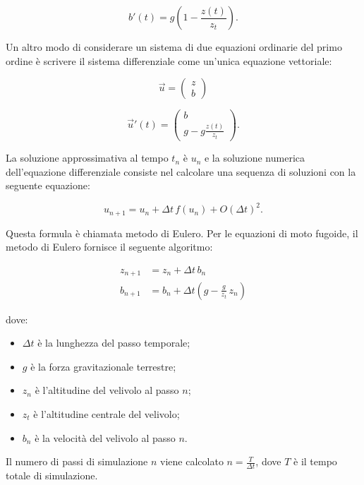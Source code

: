 \begin{equation}
b'(t) = g\left(1-\frac{z(t)}{z_t}\right).
\end{equation}

\noindent
Un altro modo di considerare un sistema di due equazioni ordinarie del primo ordine è scrivere il sistema differenziale come un’unica equazione vettoriale:

\begin{equation}
\vec{u}  = \begin{pmatrix} z \\ b \end{pmatrix}
\end{equation}

\begin{equation}
\vec{u}'(t)  = \begin{pmatrix} b\\ g-g\frac{z(t)}{z_t} \end{pmatrix}.
\end{equation}

\noindent
La soluzione approssimativa al tempo $t_n$ è $u_n$ e la soluzione numerica dell’equazione differenziale consiste nel calcolare una sequenza di soluzioni con la seguente equazione:

\begin{equation}
u_{n+1} = u_n + \Delta t \,f(u_n) + O(\Delta t)^2.
\end{equation}

\noindent
Questa formula è chiamata metodo di Eulero. Per le equazioni di moto fugoide, il metodo di Eulero fornisce il seguente algoritmo:

\begin{align}
z_{n+1} & = z_n + \Delta t \, b_n \\
b_{n+1} & = b_n + \Delta t \left(g - \frac{g}{z_t} \, z_n \right)
\end{align}

\noindent
dove:
\begin{itemize}
\item $\Delta t$ è la lunghezza del passo temporale;
\item $g$ è la forza gravitazionale terrestre;
\item $z_n$ è l'altitudine del velivolo al passo $n$;
\item $z_t$ è l'altitudine centrale del velivolo;
\item $b_n$ è la velocità del velivolo al passo $n$.
\end{itemize}

\noindent
Il numero di passi di simulazione $n$ viene calcolato $n = \frac{T}{\Delta t}$, dove $T$ è il
tempo totale di simulazione.

